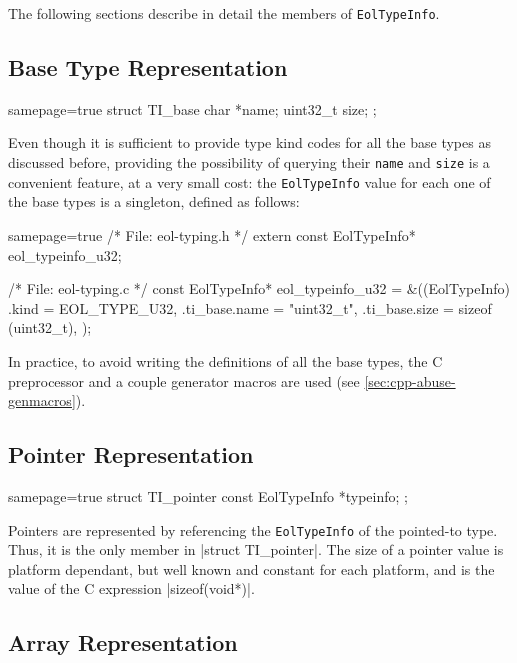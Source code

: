 \noindent
The following sections describe in detail the members of \verb|EolTypeInfo|.


\subsection{Base Type Representation}

\begin{ccode*}{samepage=true}
  struct TI_base {
    char               *name;
    uint32_t            size;
  };
\end{ccode*}

\noindent
Even though it is sufficient to provide type kind codes for all the base types
as discussed before, providing the possibility of querying their \verb|name|
and \verb|size| is a convenient feature, at a very small cost: the
\verb|EolTypeInfo| value for each one of the base types is a singleton,
defined as follows:

\begin{ccode*}{samepage=true}
  /* File: eol-typing.h */
  extern const EolTypeInfo* eol_typeinfo_u32;

  /* File: eol-typing.c */
  const EolTypeInfo* eol_typeinfo_u32 = &((EolTypeInfo) {
    .kind         = EOL_TYPE_U32,
    .ti_base.name = "uint32_t",
    .ti_base.size = sizeof (uint32_t),
  });
\end{ccode*}

\noindent In practice, to avoid writing the definitions of all the base types,
the C preprocessor and a couple generator macros are used (see
\autoref{sec:cpp-abuse-genmacros}).


\subsection{Pointer Representation}
  \label{sec:pointer-typeinfo}

\begin{ccode*}{samepage=true}
  struct TI_pointer {
    const EolTypeInfo *typeinfo;
  };
\end{ccode*}

\noindent
Pointers are represented by referencing the \verb|EolTypeInfo| of the
pointed-to type. Thus, it is the only member in \Mc|struct TI_pointer|. The
size of a pointer value is platform dependant, but well known and constant for
each platform, and is the value of the C expression \Mc|sizeof(void*)|.


\subsection{Array Representation}

